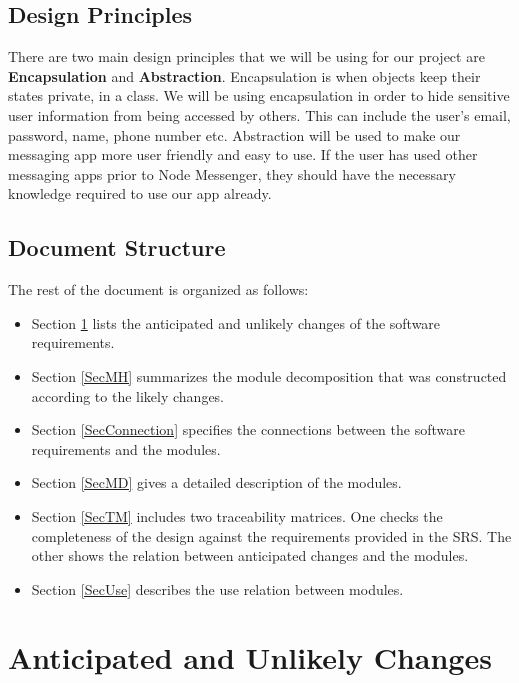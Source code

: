 \documentclass[12pt, titlepage]{article}
\begin{document}
\subsection{Design Principles}
There are two main design principles that we will be using for our project are \textbf{Encapsulation} and \textbf{Abstraction}. Encapsulation is when objects keep their states private, in a class. We will be using encapsulation in order to hide sensitive user information from being accessed by others. This can include the user's email, password, name, phone number etc. Abstraction will be used to make our messaging app more user friendly and easy to use. If the user has used other messaging apps prior to Node Messenger, they should have the necessary knowledge required to use our app already.

\subsection{Document Structure}
The rest of the document is organized as follows: 
\begin{itemize}
\item Section \ref{SecChange} lists the anticipated and unlikely changes of the software requirements.
\item Section \ref{SecMH} summarizes the module decomposition that was constructed according to the likely changes.
\item Section \ref{SecConnection} specifies the connections between the software requirements and the modules.
\item Section \ref{SecMD} gives a detailed description of the modules.
\item Section \ref{SecTM} includes two traceability matrices. One checks the completeness of the design against the requirements provided in the SRS. The other shows the relation between anticipated changes and the modules.
\item Section \ref{SecUse} describes the use relation between modules.
\end{itemize}

\section{Anticipated and Unlikely Changes} \label{SecChange}
\end{document}
